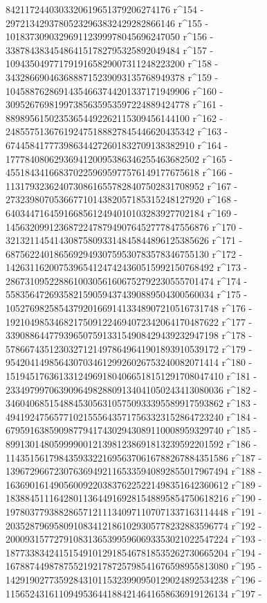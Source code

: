        8421172440303320619651379206274176 r^154 - 
       29721342937805232963832429282866146 r^155 - 
       101837309032969112399978045696247050 r^156 - 
       338784383454864151782795325892049484 r^157 - 
       1094350497717919165829007311248223200 r^158 - 
       3432866904636888715239093135768949378 r^159 - 
       10458876286914354663744201337171949906 r^160 - 
       30952676981997385635953597224889424778 r^161 - 
       88989561502353654492262115309456144100 r^162 - 
       248557513676192475188827845446620435342 r^163 - 
       674458417773986344272601832709138382910 r^164 - 
       1777840806293694120095386346255463682502 r^165 - 
       4551843416683702259695977576149177675618 r^166 - 
       11317932362407308616557828407502831708952 r^167 - 
       27323980705366771014382057185315248127920 r^168 - 
       64034471645916685612494010103283927702184 r^169 - 
       145632099123687224787949076452777847556876 r^170 - 
       321321145414308758093314845844896125385626 r^171 - 
       687562240186569294930759530783578346755130 r^172 - 
       1426311620075396541247424360515992150768492 r^173 - 
       2867310952288610030561606752792230555701474 r^174 - 
       5583564726935821590594374390889504300560034 r^175 - 
       10527698258543792016691413348907210516731748 r^176 - 
       19210498534682175091224694072342064170487622 r^177 - 
       33908864477939650759133154908429439232947198 r^178 - 
       57866743512303271214978649641901893910539172 r^179 - 
       95420414985643070346129926026753240082071414 r^180 - 
       151945176361331249691804066518151291708047410 r^181 - 
       233497997063909649828809134041050243413080036 r^182 - 
       346040685154884530563105750933395589917593862 r^183 - 
       494192475657710215556435717563323152864723240 r^184 - 
       679591638590987794174302943089110008959329740 r^185 - 
       899130148059999001213981238691813239592201592 r^186 - 
       1143515617984359332216956370616788267884351586 r^187 - 
       1396729667230763694921165335940892855017967494 r^188 - 
       1636901614905600922038376225221498351642360612 r^189 - 
       1838845111642801136449169281548895854750618216 r^190 - 
       1978037793882865712111340971107071337163114448 r^191 - 
       2035287969580910834121861029305778232883596774 r^192 - 
       2000931577279108313653995960693353021022547224 r^193 - 
       1877338342415154910129185467818535262730665204 r^194 - 
       1678874498787552192178725798541676598955813080 r^195 - 
       1429190277359284310115323990950129024892534238 r^196 - 
       1156524316110949536441884214641658636919126134 r^197 - 
